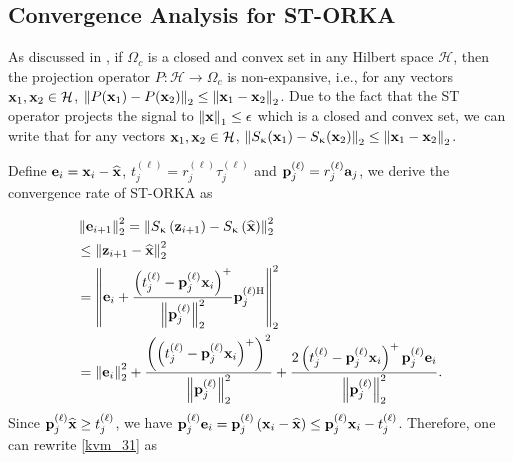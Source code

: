 \documentclass[12pt,draftcls,onecolumn]{IEEEtran}
\begin{document}
\subsection{Convergence Analysis for ST-ORKA}
\label{sta}
As discussed in \cite{escalante2011alternating}, if $\Omega_c$ is a closed and convex set in any Hilbert space $\mathcal{H}$, then the projection operator
$P: \mathcal{H} \rightarrow \Omega_c$ is non-expansive, i.e., for any vectors $\mathbf{x}_1, \mathbf{x}_2 \in \mathcal{H}$, $\left\|P(\mathbf{x}_1)-P(\mathbf{x}_2)\right\|_2\leq\left\|\mathbf{x}_1-\mathbf{x}_2\right\|_2$. Due to the fact that the ST operator projects the signal to $\left\|\mathbf{x}\right\|_1\leq \epsilon$ which is a closed and convex set,
we can write that for any vectors $\mathbf{x}_1,\mathbf{x}_2\in\mathcal{H}$, $\left\|S_{\upkappa}(\mathbf{x}_1)-S_{\upkappa}(\mathbf{x}_2)\right\|_2\leq\left\|\mathbf{x}_1-\mathbf{x}_2\right\|_2$.

Define $\mathbf{e}_i=\mathbf{x}_i-\widehat{\mathbf{x}}$, $t^{(\ell)}_{j}=r^{(\ell)}_j\tau^{(\ell)}_j$ and $\mathbf{p}^{(\ell)}_j=r^{(\ell)}_j\mathbf{a}_j$, we derive the convergence rate of ST-ORKA as

\begin{equation}
\begin{aligned}
\label{kvm_31}
&\left\|\mbe_{i+1}\right\|^2_2=\left\|S_{\upkappa}\left(\mbz_{i+1}\right)-S_{\upkappa}\left(\widehat{\mbx}\right)\right\|^2_2\\ &\leq\left\|\mbz_{i+1}-\widehat{\mbx}\right\|^2_2\\
&=\left\|\mbe_i+\frac{\left(t^{(\ell)}_j-\mbp^{(\ell)}_j\mbx_{i}\right)^+}{\left\|\mbp^{(\ell)}_j\right\|^2_2}  \mbp^{(\ell)\mathrm{H}}_j\right\|^2_2\\
&= \left\|\mbe_i\right\|^2_2+\frac{\left(\left(t^{(\ell)}_j-\mbp^{(\ell)}_j\mbx_{i}\right)^+\right)^2}{\left\|\mbp^{(\ell)}_j\right\|^2_2}+\frac{2\left(t^{(\ell)}_j-\mbp^{(\ell)}_j\mbx_{i}\right)^+\mbp^{(\ell)}_j \mbe_i}{\left\|\mbp^{(\ell)}_j\right\|^2_2}.
\end{aligned}
\end{equation} \normalsize
Since $\mathbf{p}^{(\ell)}_j\widehat{\mathbf{x}}\geq t^{(\ell)}_j$, we have
$\mathbf{p}^{(\ell)}_j\mathbf{e}_i=\mathbf{p}^{(\ell)}_j\left(\mathbf{x}_i-\widehat{\mathbf{x}}\right)\leq \mathbf{p}^{(\ell)}_j\mathbf{x}_i-t^{(\ell)}_j$. Therefore, one can rewrite \eqref{kvm_31} as
\end{document}
